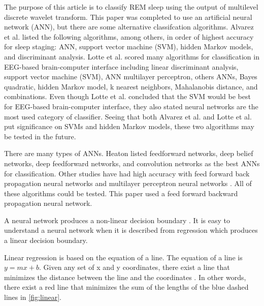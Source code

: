 \documentclass[12pt, oneside]{book}
\begin{document}
The purpose of this article is to classify REM sleep using the output of multilevel discrete wavelet transform. This paper was completed to use an artificial neural network (ANN), but there are some alternative classifcation algorithms. Alvarez et al. \cite{alvarez_usefulness_2017} listed the following algorithms, among others, in order of highest accuracy for sleep staging: ANN, support vector machine (SVM), hidden Markov models, and discriminant analysis. Lotte et al. \cite{lotte_review_2007} scored many algorithms for classification in EEG-based brain-computer interface including linear discriminant analysis, support vector machine (SVM), ANN multilayer perceptron, others ANNs, Bayes quadratic, hidden Markov model, k nearest neighbors, Mahalanobis distance, and combinations. Even though Lotte et al. \cite{lotte_review_2007} concluded that the SVM would be best for EEG-based brain-computer interface, they also stated neural networks are the most used category of classifier. Seeing that both Alvarez et al. and Lotte et al. put significance on SVMs and hidden Markov models, these two algorithms may be tested in the future.

There are many types of ANNs. Heaton \cite{heaton_artificial_2015} listed feedforward networks, deep belief networks, deep feedforward networks, and convolution networks as the best ANNs for classification. Other studies have had high accuracy with feed forward back propagation neural networks \cite{crasto_wavelet_2017} \cite{sinha_artificial_2008} and multilayer perceptron neural networks \cite{kurt_ann-based_2009} \cite{ventouras_sleep_2005}. All of these algorithms could be tested. This paper used a feed forward backward propagation neural network.

A neural network produces a non-linear decision boundary \cite{lotte_review_2007}. It is easy to understand a neural network when it is described from regression which produces a linear decision boundary. 

Linear regression is based on the equation of a line. The equation of a line is \(y = mx + b\). Given any set of x and y coordinates, there exist a line that minimizes the distance between the line and the coordinates \cite{lazyprogrammer.me_data_nodate-1}. In other words, there exist a red line that minimizes the sum of the lengths of the blue dashed lines in \ref{fig:linear}.
\end{document}
